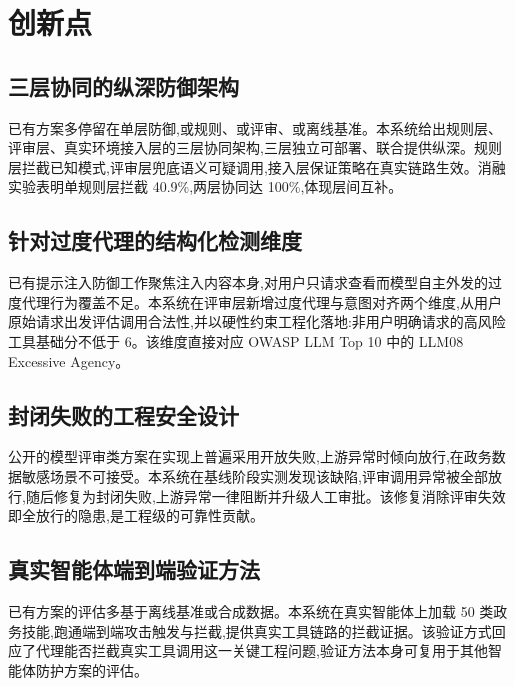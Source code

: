 \section{创新点}

\subsection{三层协同的纵深防御架构}

已有方案多停留在单层防御,或规则、或评审、或离线基准。本系统给出规则层、评审层、真实环境接入层的三层协同架构,三层独立可部署、联合提供纵深。规则层拦截已知模式,评审层兜底语义可疑调用,接入层保证策略在真实链路生效。消融实验表明单规则层拦截 40.9\%,两层协同达 100\%,体现层间互补。

\subsection{针对过度代理的结构化检测维度}

已有提示注入防御工作聚焦注入内容本身,对用户只请求查看而模型自主外发的过度代理行为覆盖不足。本系统在评审层新增过度代理与意图对齐两个维度,从用户原始请求出发评估调用合法性,并以硬性约束工程化落地:非用户明确请求的高风险工具基础分不低于 6。该维度直接对应 OWASP LLM Top 10 中的 LLM08 Excessive Agency。

\subsection{封闭失败的工程安全设计}

公开的模型评审类方案在实现上普遍采用开放失败,上游异常时倾向放行,在政务数据敏感场景不可接受。本系统在基线阶段实测发现该缺陷,评审调用异常被全部放行,随后修复为封闭失败,上游异常一律阻断并升级人工审批。该修复消除评审失效即全放行的隐患,是工程级的可靠性贡献。

\subsection{真实智能体端到端验证方法}

已有方案的评估多基于离线基准或合成数据。本系统在真实智能体上加载 50 类政务技能,跑通端到端攻击触发与拦截,提供真实工具链路的拦截证据。该验证方式回应了代理能否拦截真实工具调用这一关键工程问题,验证方法本身可复用于其他智能体防护方案的评估。
